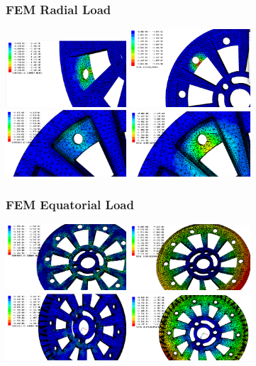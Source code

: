 \documentclass{beamer}
\begin{document}
\begin{frame}
\frametitle{FEM Radial Load}
\centering\includegraphics[width=4.5cm]{goodorig502}
\centering\includegraphics[trim = 0mm 33mm 0mm 0mm, width=4.5cm]{goodorig50dis}\\
\centering\includegraphics[width=4.5cm]{good502} 
\centering\includegraphics[width=4.5cm]{good50dis} 


\end{frame}

\begin{frame}
\frametitle{FEM Equatorial Load}
\centering\includegraphics[width=4.5cm]{rotationoriginal1}
\centering\includegraphics[width=4.5cm]{rotationoriginaldis} \\
\centering\includegraphics[width=4.5cm]{rotationnew1}
\centering\includegraphics[width=4.5cm]{rotationnewdis}


\end{frame}
\end{document}
